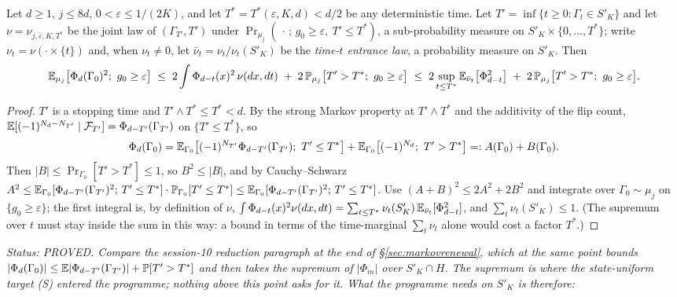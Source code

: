 \begin{proposition}\label{prop:S2red}
Let $d\ge1$, $j\le8d$, $0<\varepsilon\le1/(2K)$, and let
$T^*=T^*(\varepsilon,K,d)<d/2$ be any deterministic time.  Let
$T'=\inf\{t\ge0:\Gamma_t\in S'_K\}$ and let
$\nu=\nu_{j,\varepsilon,K,T^*}$ be the joint law of
$(\Gamma_{T'},T')$ under $\Pr_{\mu_j}(\,\cdot\,;\,g_0\ge\varepsilon,\
T'\le T^*)$, a sub-probability measure on $S'_K\times\{0,\dots,T^*\}$;
write $\nu_t=\nu(\cdot\times\{t\})$ and, when $\nu_t\ne0$, let
$\bar\nu_t=\nu_t/\nu_t(S'_K)$ be the \emph{time-$t$ entrance law}, a
probability measure on $S'_K$.  Then
\[
\E_{\mu_j}\bigl[\Phi_d(\Gamma_0)^2;\ g_0\ge\varepsilon\bigr]
\;\le\;2\int\Phi_{d-t}(x)^2\,\nu(dx,dt)
\;+\;2\,\Pr_{\mu_j}\bigl[T'>T^*;\ g_0\ge\varepsilon\bigr]
\;\le\;2\sup_{t\le T^*}\E_{\bar\nu_t}\bigl[\Phi_{d-t}^2\bigr]
\;+\;2\,\Pr_{\mu_j}\bigl[T'>T^*;\ g_0\ge\varepsilon\bigr].
\]
\end{proposition}

\begin{proof}
$T'$ is a stopping time and $T'\wedge T^*\le T^*<d$.  By the strong
Markov property at $T'\wedge T^*$ and the additivity of the flip
count, $\mathbb{E}[(-1)^{N_d-N_{T'}}\mid\mathcal F_{T'}]=\Phi_{d-T'}(\Gamma_{T'})$
on $\{T'\le T^*\}$, so
\[
\Phi_d(\Gamma_0)
=\mathbb{E}_{\Gamma_0}\bigl[(-1)^{N_{T'}}\Phi_{d-T'}(\Gamma_{T'});\ T'\le T^*\bigr]
+\mathbb{E}_{\Gamma_0}\bigl[(-1)^{N_d};\ T'>T^*\bigr]
=:A(\Gamma_0)+B(\Gamma_0).
\]
Then $|B|\le\Pr_{\Gamma_0}[T'>T^*]\le1$, so $B^2\le|B|$, and by
Cauchy--Schwarz
$A^2\le\mathbb{E}_{\Gamma_0}[\Phi_{d-T'}(\Gamma_{T'})^2;\,T'\le T^*]\cdot
\mathbb{P}_{\Gamma_0}[T'\le T^*]\le\mathbb{E}_{\Gamma_0}[\Phi_{d-T'}(\Gamma_{T'})^2;\,T'\le T^*]$.
Use $(A+B)^2\le2A^2+2B^2$ and integrate over $\Gamma_0\sim\mu_j$ on
$\{g_0\ge\varepsilon\}$; the first integral is, by definition of
$\nu$, $\int\Phi_{d-t}(x)^2\nu(dx,dt)=\sum_{t\le T^*}\nu_t(S'_K)\,
\mathbb{E}_{\bar\nu_t}[\Phi_{d-t}^2]$, and $\sum_t\nu_t(S'_K)\le1$.  (The
supremum over $t$ must stay inside the sum in this way: a bound in
terms of the time-marginal $\sum_t\nu_t$ alone would cost a factor
$T^*$.)
\end{proof}

\emph{Status: PROVED.  Compare the session-10 reduction paragraph at
the end of \S\ref{sec:markovrenewal}, which at the same point bounds
$|\Phi_d(\Gamma_0)|\le\mathbb{E}|\Phi_{d-T'}(\Gamma_{T'})|+\mathbb{P}[T'>T^*]$ and
then takes the supremum of $|\Phi_m|$ over $S'_K\cap H$.  The
supremum is where the state-uniform target (S) entered the
programme; nothing above this point asks for it.  What the programme
needs on $S'_K$ is therefore:}

